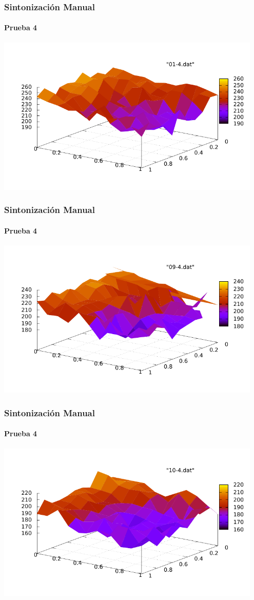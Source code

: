 \frame
{
\frametitle{Sintonización Manual}
\framesubtitle{Prueba 4}

\begin{center}
	\includegraphics[width=0.95\textwidth]{../doc/img/01-4.pdf}
\end{center}
}

\frame
{
\frametitle{Sintonización Manual}
\framesubtitle{Prueba 4}

\begin{center}
	\includegraphics[width=0.95\textwidth]{../doc/img/09-4.pdf}
\end{center}
}

\frame
{
\frametitle{Sintonización Manual}
\framesubtitle{Prueba 4}

\begin{center}
	\includegraphics[width=0.95\textwidth]{../doc/img/10-4.pdf}
\end{center}
}


